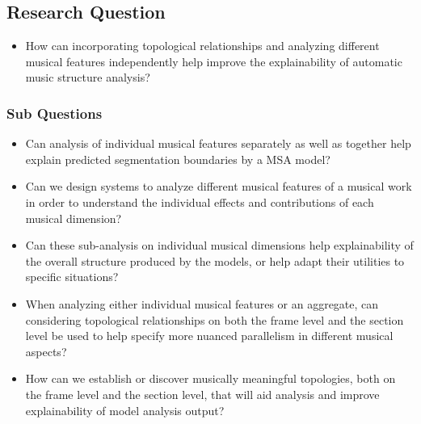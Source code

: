 

\subsection{Research Question}
\begin{itemize}
	\item How can incorporating topological relationships and analyzing different musical features independently help improve the explainability of automatic music structure analysis?
\end{itemize}

\subsubsection{Sub Questions}
\begin{itemize}
	\item Can analysis of individual musical features separately as well as together help explain predicted segmentation boundaries by a MSA model?
	\item Can we design systems to analyze different musical features of a musical work in order to understand the individual effects and contributions of each musical dimension? 
	\item Can these sub-analysis on individual musical dimensions help explainability of the overall structure produced by the models, or help adapt their utilities to specific situations?
	\item When analyzing either individual musical features or an aggregate, can considering topological relationships on both the frame level and the section level be used to help specify more nuanced parallelism in different musical aspects?
	\item How can we establish or discover musically meaningful topologies, both on the frame level and the section level, that will aid analysis and improve explainability of model analysis output?
\end{itemize}
